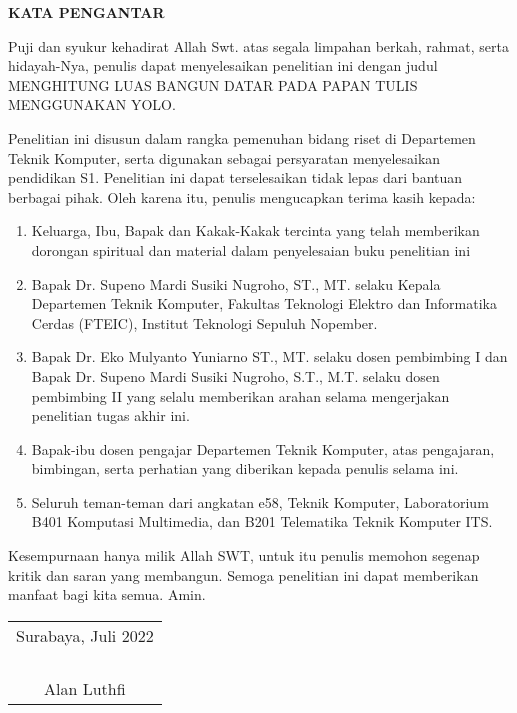 \begin{center}
  \Large
  \textbf{KATA PENGANTAR}
\end{center}


\vspace{2ex}


Puji dan syukur kehadirat Allah Swt. atas segala limpahan
berkah, rahmat, serta hidayah-Nya, penulis dapat menyelesaikan
penelitian ini dengan judul MENGHITUNG LUAS BANGUN DATAR PADA PAPAN TULIS MENGGUNAKAN YOLO.

Penelitian ini disusun dalam rangka pemenuhan bidang riset
di Departemen Teknik Komputer, serta digunakan sebagai persyaratan menyelesaikan pendidikan S1. Penelitian ini dapat terselesaikan tidak lepas dari bantuan berbagai pihak. Oleh karena itu,
penulis mengucapkan terima kasih kepada:

\begin{enumerate}[nolistsep]

  \item Keluarga, Ibu, Bapak dan Kakak-Kakak tercinta yang telah
  memberikan dorongan spiritual dan material dalam penyelesaian buku penelitian ini

  \item Bapak Dr. Supeno Mardi Susiki Nugroho, ST., MT. selaku Kepala Departemen Teknik Komputer, Fakultas Teknologi
  Elektro dan Informatika Cerdas (FTEIC), Institut Teknologi
  Sepuluh Nopember.

  \item Bapak Dr. Eko Mulyanto Yuniarno ST., MT. selaku
  dosen pembimbing I dan Bapak Dr. Supeno Mardi Susiki Nugroho, S.T., M.T. selaku dosen pembimbing II yang selalu memberikan arahan selama mengerjakan penelitian tugas akhir ini.
  
  \item Bapak-ibu dosen pengajar Departemen Teknik Komputer, atas
  pengajaran, bimbingan, serta perhatian yang diberikan kepada penulis selama ini.
  
  \item Seluruh teman-teman dari angkatan e58, Teknik Komputer,
  Laboratorium B401 Komputasi Multimedia, dan B201 Telematika Teknik Komputer ITS.

\end{enumerate}

Kesempurnaan hanya milik Allah SWT, untuk itu penulis memohon segenap kritik dan saran yang membangun. Semoga penelitian ini dapat memberikan manfaat bagi kita semua. Amin.

\begin{flushright}
  \begin{tabular}[b]{c}
    Surabaya, Juli 2022\\
    \\
    \\
    \\
    \\
    Alan Luthfi
  \end{tabular}
\end{flushright}
